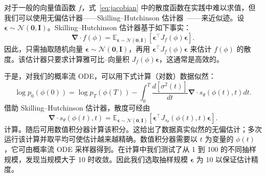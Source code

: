 对于一般的向量值函数 $f$，式~\eqref{eq:jacobian} 中的散度函数在实践中难以求值，但我们可以使用无偏估计器——Skilling--Hutchinson 估计器~\cite{grathwohl2018scalable}——来近似迹。设 $\boldsymbol \epsilon \sim \mathcal{N}(\mathbf{0}, \mathbf{I})$。Skilling--Hutchinson 估计器基于如下事实：
\begin{equation}
\mathbf{\nabla}\cdot f(\phi) = \mathbb{E}_{\boldsymbol\epsilon \sim \mathcal{N}(\mathbf{0}, \mathbf{I})}\left[\boldsymbol\epsilon^\intercal  J_f(\phi) \boldsymbol\epsilon\right].
\end{equation}
因此，只需抽取随机向量 $\boldsymbol \epsilon \sim \mathcal{N}(\mathbf{0}, \mathbf{I})$，再用 $\boldsymbol \epsilon^\intercal J_f(\phi) \boldsymbol \epsilon$ 来估计 $f(\phi)$ 的散度。该估计器只要求计算雅可比--向量积 $J_f(\phi)\boldsymbol \epsilon$，这通常是高效的。

于是，对我们的概率流 ODE，可以用下式计算（对数）数据似然：
\begin{equation}
\log p_0(\phi(0)) = \log p_T(\phi(T)) -\int_0^T \frac{d[\sigma^2(t)]}{dt} \mathbf{\nabla}\cdot s_\theta(\phi(t), t) dt.
\end{equation}
借助 Skilling--Hutchinson 估计器，散度可经由
\begin{equation}
\mathbf{\nabla}\cdot s_\theta(\phi(t), t) = \mathbb{E}_{\boldsymbol\epsilon \sim \mathcal{N}(\mathbf{0}, \mathbf{I})}\left[\boldsymbol\epsilon^\intercal  J_{s_\theta}(\phi(t), t) \boldsymbol\epsilon\right].
\end{equation}
计算。随后可用数值积分器计算该积分。这给出了数据真实似然的无偏估计；多次运行该计算并取平均可使估计越来越精确。数值积分器需要以 $t$ 为变量的 $\phi(t)$，它可由概率流 ODE 采样器得到。在计算中我们测试了从 1 到 100 的不同抽样规模，发现当规模大于 10 时收敛。因此我们选取抽样规模 $\boldsymbol\epsilon$ 为 10 以保证估计精度。


